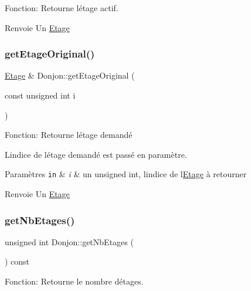 Fonction\+: Retourne l\textquotesingle{}étage actif. 

\begin{DoxyReturn}{Renvoie}
Un \mbox{\hyperlink{classEtage}{Etage}} 
\end{DoxyReturn}
\mbox{\label{classDonjon_a868c243fbaa68f2da220c91bb7e32e8e}} 
\subsubsection{\texorpdfstring{get\+Etage\+Original()}{getEtageOriginal()}}
{\footnotesize\ttfamily \mbox{\hyperlink{classEtage}{Etage}} \& Donjon\+::get\+Etage\+Original (\begin{DoxyParamCaption}\item[{const unsigned int}]{i }\end{DoxyParamCaption})}



Fonction\+: Retourne l\textquotesingle{}étage demandé 

L\textquotesingle{}indice de l\textquotesingle{}étage demandé est passé en paramètre. 
\begin{DoxyParams}[1]{Paramètres}
\mbox{\tt in}  & {\em i} & un unsigned int, l\textquotesingle{}indice de l\textquotesingle{}\mbox{\hyperlink{classEtage}{Etage}} à retourner \\
\hline
\end{DoxyParams}
\begin{DoxyReturn}{Renvoie}
Un \mbox{\hyperlink{classEtage}{Etage}} 
\end{DoxyReturn}
\mbox{\label{classDonjon_a24a730ec71daad25b5ce79bccc10797d}} 
\subsubsection{\texorpdfstring{get\+Nb\+Etages()}{getNbEtages()}}
{\footnotesize\ttfamily unsigned int Donjon\+::get\+Nb\+Etages (\begin{DoxyParamCaption}{ }\end{DoxyParamCaption}) const}



Fonction\+: Retourne le nombre d\textquotesingle{}étages. 

